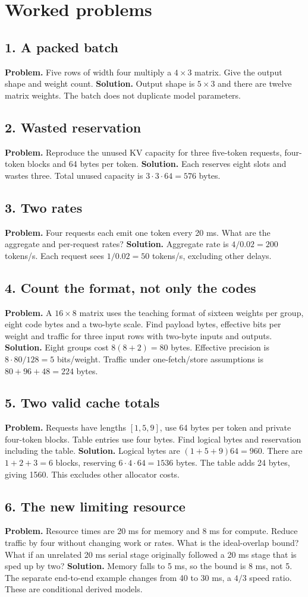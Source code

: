 \section{Worked problems}
\subsection*{1. A packed batch}
\textbf{Problem.} Five rows of width four multiply a $4\times3$ matrix.
Give the output shape and weight count.
\textbf{Solution.} Output shape is $5\times3$ and there are twelve
matrix weights. The batch does not duplicate model parameters.
\subsection*{2. Wasted reservation}
\textbf{Problem.} Reproduce the unused KV capacity for three five-token
requests, four-token blocks and 64 bytes per token.
\textbf{Solution.} Each reserves eight slots and wastes three.
Total unused capacity is $3\cdot3\cdot64=576$ bytes.
\subsection*{3. Two rates}
\textbf{Problem.} Four requests each emit one token every 20 ms.
What are the aggregate and per-request rates?
\textbf{Solution.} Aggregate rate is $4/0.02=200$ tokens/s.
Each request sees $1/0.02=50$ tokens/s, excluding other delays.
\subsection*{4. Count the format, not only the codes}
\textbf{Problem.} A $16\times8$ matrix uses the teaching format of
sixteen weights per group, eight code bytes and a two-byte scale.
Find payload bytes, effective bits per weight and traffic for three
input rows with two-byte inputs and outputs.
\textbf{Solution.} Eight groups cost $8(8+2)=80$ bytes.
Effective precision is $8\cdot80/128=5$ bits/weight.
Traffic under one-fetch/store assumptions is $80+96+48=224$ bytes.
\subsection*{5. Two valid cache totals}
\textbf{Problem.} Requests have lengths $[1,5,9]$, use 64 bytes per token
and private four-token blocks. Table entries use four bytes. Find
logical bytes and reservation including the table.
\textbf{Solution.} Logical bytes are $(1+5+9)64=960$.
There are $1+2+3=6$ blocks, reserving $6\cdot4\cdot64=1536$ bytes.
The table adds 24 bytes, giving 1560. This excludes other allocator costs.
\subsection*{6. The new limiting resource}
\textbf{Problem.} Resource times are 20 ms for memory and 8 ms for
compute. Reduce traffic by four without changing work or rates.
What is the ideal-overlap bound? What if an unrelated 20 ms serial
stage originally followed a 20 ms stage that is sped up by two?
\textbf{Solution.} Memory falls to 5 ms, so the bound is 8 ms,
not 5. The separate end-to-end example changes from 40 to 30 ms,
a $4/3$ speed ratio. These are conditional derived models.
